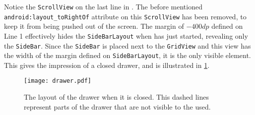 Notice the \lstinline|ScrollView| on the last line in .
The before mentioned \lstinline{android:layout_toRightOf} attribute on this \lstinline|ScrollView| has been removed, to keep it from being pushed out of the screen.
The margin of $-400dp$ defined on Line 1 effectively hides the \lstinline|SideBarLayout| when \homeactivity has just started, revealing only the \lstinline|SideBar|.
Since the \lstinline|SideBar| is placed next to the \lstinline|GridView| and this view has the width of the margin defined on \lstinline|SideBarLayout|, it is the only visible element.
This gives the impression of a closed drawer, and is illustrated in \cref{fig:drawerhidden}.

\begin{figure}[h]
\centering
\texttt{[image: drawer.pdf]}
\caption{The layout of the drawer when it is closed. This dashed lines represent parts of the drawer that are not visible to the used.}
\label{fig:drawerhidden}
\end{figure}